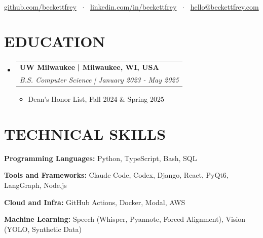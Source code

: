 \documentclass[letterpaper,11pt]{article}
\newcommand{\sep}{~{\small$\cdot$}~}
\newcommand{\resumeItem}[1]{
  \item\small{
    {#1 \vspace{-1pt}}
  }
}
\newcommand{\resumeSubheading}[4]{
  \vspace{-2pt}\item
    \begin{tabular*}{1.0\textwidth}[t]{l}
      \textbf{\large#1}\if\relax\detokenize{#2}\relax\else\textbf{ \small| #2}\fi \\
      \textit{\large#3}\if\relax\detokenize{#4}\relax\else\textit{ \small| #4}\fi \\

    \end{tabular*}\vspace{-7pt}
}
\newcommand{\resumeSubHeadingListStart}{\begin{itemize}[leftmargin=0.0in, label={}]}
\newcommand{\resumeSubHeadingListEnd}{\end{itemize}}
\newcommand{\resumeItemListStart}{\begin{itemize}[leftmargin=0.1in]}
\newcommand{\resumeItemListEnd}{\end{itemize}\vspace{-5pt}}
\begin{document}


\begin{center}
    \pdfinterwordspaceon \\ \vspace{4pt}
    \href{https://github.com/beckettfrey}{github.com/beckettfrey} \sep
    \href{https://linkedin.com/in/beckettfrey}{linkedin.com/in/beckettfrey} \sep
    \href{mailto:hello@beckettfrey.com}{hello@beckettfrey.com}
    \vspace{-7pt}
\end{center}

\section{\color{airforceblue}EDUCATION}
  \resumeSubHeadingListStart
    \resumeSubheading
      {UW Milwaukee}{Milwaukee, WI, USA}
      {B.S. Computer Science}{January 2023 - May 2025}
      \resumeItemListStart
        \resumeItem{\normalsize{Dean's Honor List, Fall 2024 \& Spring 2025}}
      \resumeItemListEnd
  \resumeSubHeadingListEnd
  \vspace{-16pt}

\section{\color{airforceblue}TECHNICAL SKILLS}
 \begin{itemize}[leftmargin=0in, label={}]
    \small{\item{
     \textbf{\normalsize{Programming Languages:}}{ \normalsize{Python, TypeScript, Bash, SQL}} \\
      \vspace{1.2pt}
      
     \textbf{\normalsize{Tools and Frameworks:}}{ \normalsize{Claude Code, Codex, Django, React, PyQt6, LangGraph, Node.js}} \\
      \vspace{1.2pt}

     \textbf{\normalsize{Cloud and Infra:}}{ \normalsize{GitHub Actions, Docker, Modal, AWS}} \\
      \vspace{1.2pt}

     \textbf{\normalsize{Machine Learning:}}{ \normalsize{Speech (Whisper, Pyannote, Forced Alignment), Vision (YOLO, Synthetic Data)}} \\
      \vspace{1.2pt}
     }}
 \end{itemize}
 \vspace{-16pt}
 
\end{document}
